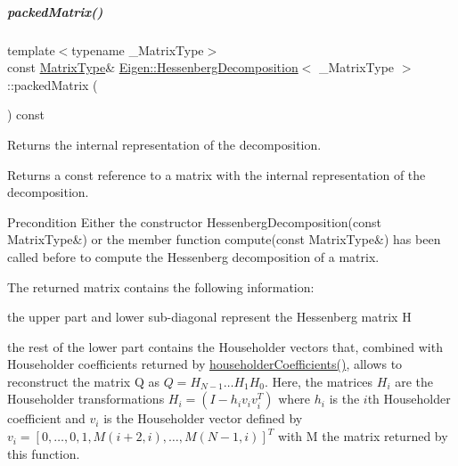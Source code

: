\mbox{\label{group___eigenvalues___module_a1f72b7612fd4edc5a6f31005e433e1dd}} 
\subparagraph{\texorpdfstring{packed\+Matrix()}{packedMatrix()}\hspace{0.1cm}{\footnotesize\ttfamily [2/2]}}
{\footnotesize\ttfamily template$<$typename \+\_\+\+Matrix\+Type$>$ \\
const \hyperlink{group___eigenvalues___module_a93a611350a7db9d1da18f2c828ecea9f}{Matrix\+Type}\& \hyperlink{group___eigenvalues___module_class_eigen_1_1_hessenberg_decomposition}{Eigen\+::\+Hessenberg\+Decomposition}$<$ \+\_\+\+Matrix\+Type $>$\+::packed\+Matrix (\begin{DoxyParamCaption}{ }\end{DoxyParamCaption}) const\hspace{0.3cm}{\ttfamily [inline]}}



Returns the internal representation of the decomposition. 

\begin{DoxyReturn}{Returns}
a const reference to a matrix with the internal representation of the decomposition.
\end{DoxyReturn}
\begin{DoxyPrecond}{Precondition}
Either the constructor Hessenberg\+Decomposition(const Matrix\+Type\&) or the member function compute(const Matrix\+Type\&) has been called before to compute the Hessenberg decomposition of a matrix.
\end{DoxyPrecond}
The returned matrix contains the following information\+:
\begin{DoxyItemize}
\item the upper part and lower sub-\/diagonal represent the Hessenberg matrix H
\item the rest of the lower part contains the Householder vectors that, combined with Householder coefficients returned by \hyperlink{group___eigenvalues___module_a65fa81ce79d956baa59a30a6d82f8a84}{householder\+Coefficients()}, allows to reconstruct the matrix Q as $ Q = H_{N-1} \ldots H_1 H_0 $. Here, the matrices $ H_i $ are the Householder transformations $ H_i = (I - h_i v_i v_i^T) $ where $ h_i $ is the $ i $th Householder coefficient and $ v_i $ is the Householder vector defined by $ v_i = [ 0, \ldots, 0, 1, M(i+2,i), \ldots, M(N-1,i) ]^T $ with M the matrix returned by this function.
\end{DoxyItemize}

